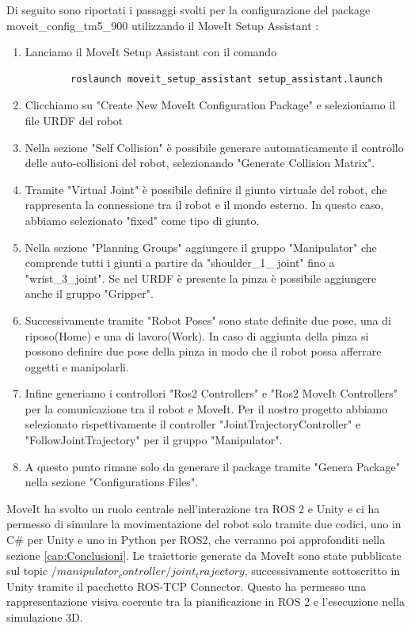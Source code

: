 \documentclass[11pt]{report}
\begin{document}
Di seguito sono riportati i passaggi svolti per la configurazione del package moveit\_config\_tm5\_900 utilizzando il MoveIt Setup Assistant \cite{Moveit_tutorial}: 
\begin{enumerate}
    \item Lanciamo il MoveIt Setup Assistant con il comando \begin{verbatim}
        roslaunch moveit_setup_assistant setup_assistant.launch
    \end{verbatim}
    \item Clicchiamo su "Create New MoveIt Configuration Package" e selezioniamo il file URDF del robot
    \item Nella sezione "Self Collision" è possibile generare automaticamente il controllo delle auto-collisioni del robot, selezionando "Generate Collision Matrix".
    \item Tramite "Virtual Joint" è possibile definire il giunto virtuale del robot, che rappresenta la connessione tra il robot e il mondo esterno. In questo caso, abbiamo selezionato "fixed" come tipo di giunto.
    \item Nella sezione "Planning Groups" aggiungere il gruppo "Manipulator" che comprende tutti i giunti a partire da "shoulder\_1\_ joint" fino a "wrist\_3\_joint". Se nel URDF è presente la pinza è possibile aggiungere anche il gruppo "Gripper".
    \item Successivamente tramite "Robot Poses" sono state definite due pose, una di riposo(Home) e una di lavoro(Work). In caso di aggiunta della pinza si possono definire due pose della pinza in modo che il robot possa afferrare oggetti e manipolarli.
    \item Infine generiamo i controllori "Ros2 Controllers" e "Ros2 MoveIt Controllers" per la comunicazione tra il robot e MoveIt. Per il nostro progetto abbiamo selezionato rispettivamente il controller "JointTrajectoryController" e "FollowJointTrajectory" per il gruppo "Manipulator".
    \item A questo punto rimane solo da generare il package tramite "Genera Package" nella sezione "Configurations Files".
\end{enumerate}

MoveIt ha svolto un ruolo centrale nell’interazione tra ROS 2 e Unity e ci ha permesso di simulare la movimentazione del robot solo tramite due codici, uno in C\# per Unity e uno in Python per ROS2, che verranno poi approfonditi nella sezione \ref{cap:Conclusioni}. Le traiettorie generate da MoveIt sono state pubblicate sul topic $/manipulator_controller/joint_trajectory$, successivamente sottoscritto in Unity tramite il pacchetto ROS-TCP Connector. Questo ha permesso una rappresentazione visiva coerente tra la pianificazione in ROS 2 e l’esecuzione nella simulazione 3D.
\end{document}
